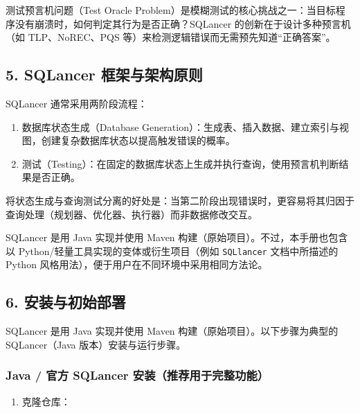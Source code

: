 \documentclass[
]{article}
\providecommand{\tightlist}{%
  \setlength{\itemsep}{0pt}\setlength{\parskip}{0pt}}
\begin{document}
测试预言机问题（Test Oracle
Problem）是模糊测试的核心挑战之一：当目标程序没有崩溃时，如何判定其行为是否正确？SQLancer
的创新在于设计多种预言机（如 TLP、NoREC、PQS
等）来检测逻辑错误而无需预先知道``正确答案''。

\subsection{5. SQLancer
框架与架构原则}\label{sqlancer-ux6846ux67b6ux4e0eux67b6ux6784ux539fux5219}

SQLancer 通常采用两阶段流程：

\begin{enumerate}
\def\labelenumi{\arabic{enumi}.}
\tightlist
\item
  数据库状态生成（Database
  Generation）：生成表、插入数据、建立索引与视图，创建复杂数据库状态以提高触发错误的概率。\\
\item
  测试（Testing）：在固定的数据库状态上生成并执行查询，使用预言机判断结果是否正确。
\end{enumerate}

将状态生成与查询测试分离的好处是：当第二阶段出现错误时，更容易将其归因于查询处理（规划器、优化器、执行器）而非数据修改交互。

SQLancer 是用 Java 实现并使用 Maven
构建（原始项目）。不过，本手册也包含以
Python/轻量工具实现的变体或衍生项目（例如 \texttt{SQLlancer}
文档中所描述的 Python 风格用法），便于用户在不同环境中采用相同方法论。

\subsection{6.
安装与初始部署}\label{ux5b89ux88c5ux4e0eux521dux59cbux90e8ux7f72}

SQLancer 是用 Java 实现并使用 Maven 构建（原始项目）。以下步骤为典型的
SQLancer（Java 版本）安装与运行步骤。

\subsubsection{Java / 官方 SQLancer
安装（推荐用于完整功能）}\label{java-ux5b98ux65b9-sqlancer-ux5b89ux88c5ux63a8ux8350ux7528ux4e8eux5b8cux6574ux529fux80fd}

\begin{enumerate}
\def\labelenumi{\arabic{enumi}.}
\tightlist
\item
  克隆仓库：
\end{enumerate}
\end{document}
